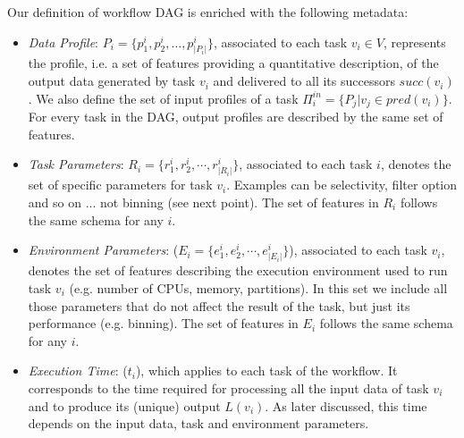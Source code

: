 \documentclass[a4paper, 10pt, conference]{ieeeconf}      %
\begin{document}
Our definition of workflow DAG is enriched with the following metadata:
\begin{itemize}
    
    \item \textit{Data Profile}:  $P_{i} = \{p^{i}_1, p^{i}_2, \ldots,p^{i}_{|P_{i}|}\}$, associated to each task $v_i\in V$, represents the profile, i.e. a set of features providing a quantitative description, of the output data generated by task $v_i$ and delivered to all its successors $succ(v_i)$. We also define the set of input profiles  of a task $\Pi_i^{in} = \{ P_{j} | v_j \in pred(v_i)\}$. For every task in the DAG, output profiles are described by the same set of features. 
    
    \item \textit{Task Parameters}: $R_{i} = \{r^i_1, r^i_2, \cdots, r^i_{|R_{i}|} \} $, associated to each task $i$, denotes the set of specific parameters for task $v_i$. Examples can be selectivity, filter option and so on ... not binning (see next point). The set of features in $R_i$ follows the same schema for any $i$.
    \item  \textit{Environment Parameters}: ($E_{i} = \{e^i_1, e^i_2, \cdots, e^i_{|E_{i}|} \} $), associated to each task $v_i$, denotes the set of features describing the execution environment used to run task  $v_i$ (e.g. number of CPUs, memory, partitions). In this set we include all those parameters that do not affect the result of the task, but just its performance (e.g. binning). The set of features in $E_i$ follows the same schema for any $i$.
    \item \textit{Execution Time}: ($t_i$), which applies to each task of the workflow. It corresponds to the time required for processing all the input data of task $v_i$  and to produce its (unique) output $L(v_i)$. As later discussed, this time depends on the input data, task and environment parameters. 
\end{itemize}
\end{document}
